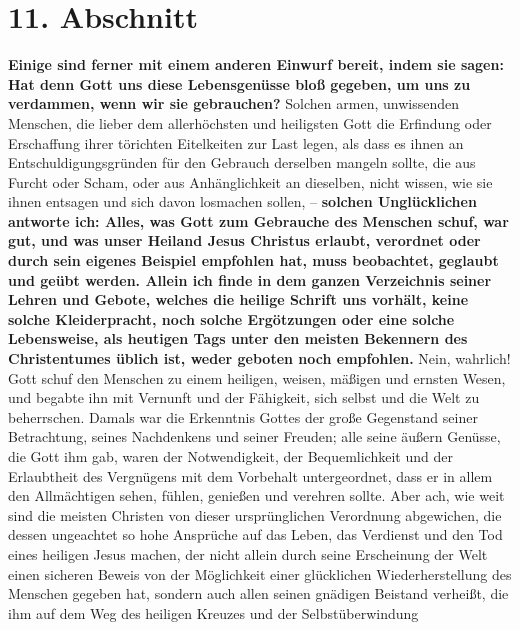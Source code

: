 \section{11. Abschnitt} \label{kap17_ab11}

\label{ref:17_11_einwand_2} \textbf{Einige sind ferner mit einem anderen
Einwurf
bereit, indem sie sagen:
Hat denn
Gott uns diese Lebensgenüsse bloß gegeben, um uns zu verdammen, wenn wir sie
gebrauchen?} Solchen armen, unwissenden Menschen, die lieber dem allerhöchsten
und heiligsten Gott die Erfindung oder Erschaffung ihrer törichten Eitelkeiten
zur Last legen, als dass es ihnen an Entschuldigungsgründen für den Gebrauch
derselben mangeln sollte, die aus Furcht oder Scham, oder aus Anhänglichkeit an
dieselben, nicht wissen, wie sie ihnen entsagen und sich davon losmachen sollen,
-- \label{ref:17_11_beteubung}\textbf{solchen Unglücklichen antworte ich: Alles,
was Gott zum Gebrauche
des
Menschen schuf, war gut, und was unser Heiland Jesus Christus erlaubt,
verordnet oder durch sein eigenes Beispiel empfohlen hat, muss beobachtet,
geglaubt und geübt werden. 
Allein ich
finde in dem ganzen Verzeichnis seiner Lehren und Gebote, welches die heilige
Schrift uns vorhält, keine solche Kleiderpracht, noch solche Ergötzungen oder
eine solche Lebensweise, als heutigen Tags unter den meisten Bekennern des
Christentumes üblich ist, weder geboten noch empfohlen.} Nein, wahrlich! Gott
schuf den Menschen zu einem heiligen, weisen, mäßigen und ernsten Wesen, und
begabte ihn mit Vernunft und der Fähigkeit, sich selbst und die Welt zu
beherrschen.
Damals war die Erkenntnis Gottes der große Gegenstand seiner Betrachtung, seines
Nachdenkens und seiner Freuden; alle seine äußern Genüsse, die Gott ihm gab,
waren der Notwendigkeit, der Bequemlichkeit und der Erlaubtheit des Vergnügens
mit dem Vorbehalt untergeordnet, dass er in allem den Allmächtigen sehen,
fühlen, genießen und verehren sollte. Aber ach, wie weit sind die meisten
Christen von dieser ursprünglichen Verordnung abgewichen, die dessen ungeachtet
so hohe Ansprüche auf das Leben, das Verdienst und den Tod eines heiligen Jesus
machen, der nicht allein durch seine Erscheinung der Welt einen sicheren Beweis
von der Möglichkeit einer glücklichen Wiederherstellung des Menschen gegeben
hat, sondern auch allen seinen gnädigen Beistand verheißt, die ihm auf dem Weg
des heiligen Kreuzes und der
Selbstüberwindung
